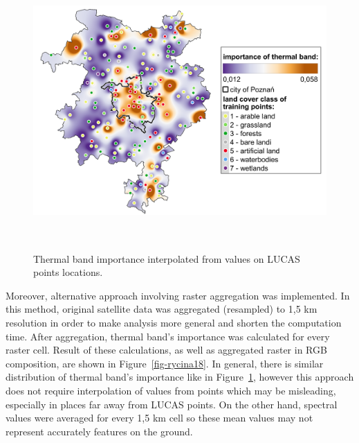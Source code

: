 \documentclass{amuthesis}
\begin{document}
\begin{figure}[H]

{\centering \includegraphics[width=5.875in,height=4.16667in]{./figures/B10_importance-spatial-ENG.png}

}

\caption{\label{fig-rycina17}Thermal band importance interpolated from
values on LUCAS points locations.}

\end{figure}

Moreover, alternative approach involving raster aggregation was
implemented. In this method, original satellite data was aggregated
(resampled) to 1,5 km resolution in order to make analysis more general
and shorten the computation time. After aggregation, thermal band's
importance was calculated for every raster cell. Result of these
calculations, as well as aggregated raster in RGB composition, are shown
in Figure~\ref{fig-rycina18}. In general, there is similar distribution
of thermal band's importance like in Figure~\ref{fig-rycina17}, however
this approach does not require interpolation of values from points which
may be misleading, especially in places far away from LUCAS points. On
the other hand, spectral values were averaged for every 1,5 km cell so
these mean values may not represent accurately features on the ground.
\end{document}
